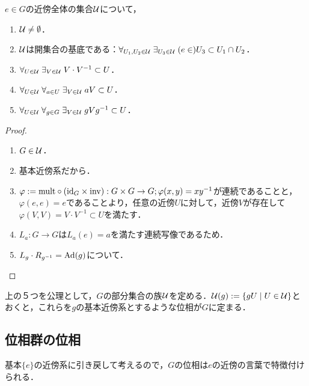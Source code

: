 \documentclass[uplatex,dvipdfmx]{jsreport}
\begin{document}
\begin{lemma}[使える連続写像のレパートリー]\label{lemma-morphism-toolset-for-topological-group}
    $e\in G$の近傍全体の集合$\mathcal{U}$について，
    \begin{enumerate}
        \item $\mathcal{U}\ne\emptyset$．
        \item $\mathcal{U}$は開集合の基底である：$\forall_{U_1,U_2\in\mathcal{U}}\;\exists_{U_3\in\mathcal{U}}\;(e\in)U_3\subset U_1\cap U_2$．
        \item $\forall_{U\in\mathcal{U}}\;\exists_{V\in\mathcal{U}}\;V\cdot V^{-1}\subset U$．
        \item $\forall_{U\in\mathcal{U}}\;\forall_{a\in U}\;\exists_{V\in\mathcal{U}}\;aV\subset U$．
        \item $\forall_{U\in\mathcal{U}}\;\forall_{g\in G}\;\exists_{V\in\mathcal{U}}\;gVg^{-1}\subset U$．
    \end{enumerate}
\end{lemma}
\begin{proof}\mbox{}
    \begin{enumerate}
        \item $G\in\mathcal{U}$．
        \item 基本近傍系だから．
        \item $\varphi:=\mathrm{mult}\circ(\mathrm{id}_G\times\mathrm{inv}):G\times G\to G;\varphi(x,y)=xy^{-1}$が連続であることと，$\varphi(e,e)=e$であることより，任意の近傍$U$に対して，近傍$V$が存在して$\varphi(V,V)=V\cdot V^{-1}\subset U$を満たす．
        \item $L_a:G\to G$は$L_a(e)=a$を満たす連続写像であるため．
        \item $L_g\cdot R_{g^{-1}}=\mathrm{Ad}(g)$について．
    \end{enumerate}
\end{proof}
\begin{remark}
    上の５つを公理として，$G$の部分集合の族$\mathcal{U}$を定める．$\mathcal{U}(g):=\left\{gU\mid U\in\mathcal{U}\right\}$とおくと，これらを$g$の基本近傍系とするような位相が$G$に定まる．
\end{remark}

\subsection{位相群の位相}

\begin{tcolorbox}[colframe=ForestGreen, colback=ForestGreen!10!white,breakable,colbacktitle=ForestGreen!40!white,coltitle=black,fonttitle=\bfseries\sffamily,
title=]
    基本$\{e\}$の近傍系に引き戻して考えるので，$G$の位相は$e$の近傍の言葉で特徴付けられる．
\end{tcolorbox}
\end{document}
